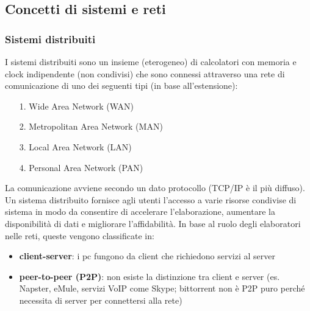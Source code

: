 \documentclass[a4paper]{article}
\begin{document}

\subsection{Concetti di sistemi e reti}
\subsubsection*{Sistemi distribuiti}
I sistemi distribuiti sono un insieme (eterogeneo) di calcolatori con memoria e clock indipendente (non condivisi) che sono
connessi attraverso una rete di comunicazione di uno dei seguenti tipi (in base all'estensione):
\begin{itemize}
	\item[1.] Wide Area Network (WAN)
	\item[2.] Metropolitan Area Network (MAN)
	\item[3.] Local Area Network (LAN)
	\item[4.] Personal Area Network (PAN)
\end{itemize}
La comunicazione avviene secondo un dato protocollo (TCP/IP è il più diffuso). Un sistema distribuito fornisce agli utenti
l’accesso a varie risorse condivise di sistema in modo da consentire di accelerare l’elaborazione, aumentare la disponibilità
di dati e migliorare l’affidabilità. In base al ruolo degli elaboratori nelle reti, queste vengono classificate in:
\begin{itemize}
	\item \textbf{client-server}: i pc fungono da client che richiedono servizi al server
	\item \textbf{peer-to-peer (P2P)}: non esiste la distinzione tra client e server (es. Napster, eMule, servizi VoIP come Skype;
	bittorrent non è P2P puro perché necessita di server per connettersi alla rete)
\end{itemize}
\end{document}
